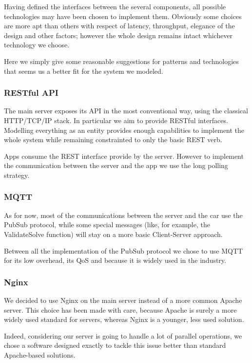 \documentclass[11pt]{article} %
\begin{document}
Having defined the interfaces between the several components, all possible technologies may have been chosen to implement them. Obviously some choices are more apt than others with respect of latency, throughput, elegance of the design and other factors; however the whole design remains intact whichever technology we choose.

Here we simply give some reasonable suggestions for patterns and technologies that seems us a better fit for the system we modeled.

\subsubsection{RESTful API}

The main server exposes its API in the most conventional way, using the classical HTTP/TCP/IP stack. In particular we aim to provide RESTful interfaces. Modelling everything as an entity provides enough capabilities to implement the whole system while remaining constrainted to only the basic REST verb.

Apps consume the REST interface provide by the server. However to implement the communication between the server and the app we use the long polling strategy.

\subsubsection{MQTT}

As for now, most of the communications between the server and the car use the PubSub protocol, while some special messages (like, for example, the ValidateSolve function) will stay on a more basic Client-Server approach.

 Between all the implementation of the PubSub protocol we chose to use MQTT for its low overhead, its QoS and because it is widely used in the industry.

\subsubsection{Nginx}

We decided to use Nginx on the main server instead of a more common Apache server. This choice has been made with care, because Apache is surely a more widely used standard for servers, whereas Nginx is a younger, less used solution. 

Indeed, considering our server is going to handle a lot of parallel operations, we chose a software designed exactly to tackle this issue better than standard Apache-based solutions.
\end{document}
